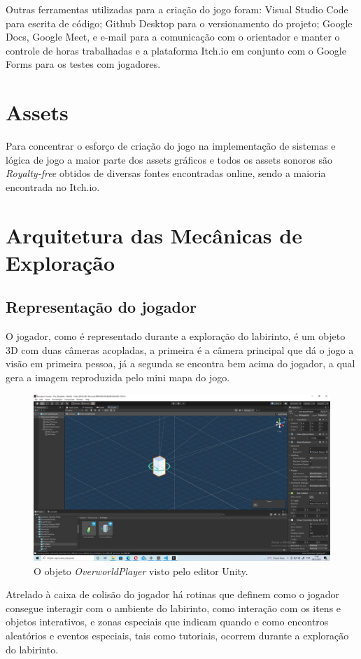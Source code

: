 \documentclass[
	12pt,				%
	openright,			%
	twoside,			%
	a4paper,			%
	english,			%
	french,				%
	spanish,			%
	brazil				%
	]{abntex2}
\begin{document}
Outras ferramentas utilizadas para a criação do jogo foram: Visual Studio Code para escrita de código;
Github Desktop para o versionamento do projeto; Google Docs, Google Meet, e e-mail para a
comunicação com o orientador e manter o controle de horas trabalhadas e a plataforma Itch.io em conjunto com o Google Forms para os testes com jogadores.
\pagebreak
\section{Assets}

Para concentrar o esforço de criação do jogo na implementação de sistemas e lógica de jogo a maior parte dos assets gráficos e todos os assets sonoros são \emph{Royalty-free} obtidos de diversas fontes encontradas online, sendo a maioria encontrada no Itch.io. %


\section{Arquitetura das Mecânicas de Exploração}


\subsection{Representação do jogador}

O jogador, como é representado durante a exploração do labirinto, é um objeto 3D com duas câmeras acopladas, a primeira é a câmera principal que dá o jogo a visão em primeira pessoa, já a segunda se encontra bem acima do jogador, a qual gera a imagem reproduzida pelo mini mapa do jogo.
 

\begin{figure}[h!]
 \centering
  \includegraphics[width=0.65\linewidth]{playerobject.jpg}
  \caption{O objeto \emph{OverworldPlayer} visto pelo editor Unity.}
  \label{fig:playerobject}
\end{figure}

Atrelado à caixa de colisão do jogador há rotinas que definem como o jogador consegue interagir com o ambiente do labirinto, como interação com os itens e objetos interativos, e zonas especiais que indicam quando e como encontros aleatórios e eventos especiais, tais como tutoriais, ocorrem durante a exploração do labirinto.
\end{document}
